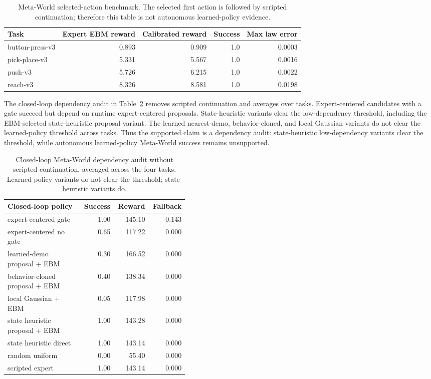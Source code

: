 \documentclass{article}
\begin{document}
\begin{table}[t]
\centering
\small
\setlength{\tabcolsep}{4pt}
\begin{tabular}{lrrrr}
\toprule
Task & Expert EBM reward & Calibrated reward & Success & Max law error \\
\midrule
button-press-v3 & 0.893 & 0.909 & 1.0 & 0.0003 \\
pick-place-v3 & 5.331 & 5.567 & 1.0 & 0.0016 \\
push-v3 & 5.726 & 6.215 & 1.0 & 0.0022 \\
reach-v3 & 8.326 & 8.581 & 1.0 & 0.0198 \\
\bottomrule
\end{tabular}
\caption{Meta-World selected-action benchmark. The selected first action is followed by scripted continuation; therefore this table is not autonomous learned-policy evidence.}
\label{tab:metaworld-selected}
\end{table}

The closed-loop dependency audit in Table~\ref{tab:closed-loop} removes scripted continuation and averages over tasks. Expert-centered candidates with a gate succeed but depend on runtime expert-centered proposals. State-heuristic variants clear the low-dependency threshold, including the EBM-selected state-heuristic proposal variant. The learned nearest-demo, behavior-cloned, and local Gaussian variants do not clear the learned-policy threshold across tasks. Thus the supported claim is a dependency audit: state-heuristic low-dependency variants clear the threshold, while autonomous learned-policy Meta-World success remains unsupported.

\begin{table}[t]
\centering
\small
\setlength{\tabcolsep}{3pt}
\begin{tabular}{p{0.42\linewidth}rrr}
\toprule
Closed-loop policy & Success & Reward & Fallback \\
\midrule
expert-centered gate & 1.00 & 145.10 & 0.143 \\
expert-centered no gate & 0.65 & 117.22 & 0.000 \\
learned-demo proposal + EBM & 0.30 & 166.52 & 0.000 \\
behavior-cloned proposal + EBM & 0.40 & 138.34 & 0.000 \\
local Gaussian + EBM & 0.05 & 117.98 & 0.000 \\
state heuristic proposal + EBM & 1.00 & 143.28 & 0.000 \\
state heuristic direct & 1.00 & 143.14 & 0.000 \\
random uniform & 0.00 & 55.40 & 0.000 \\
scripted expert & 1.00 & 143.14 & 0.000 \\
\bottomrule
\end{tabular}
\caption{Closed-loop Meta-World dependency audit without scripted continuation, averaged across the four tasks. Learned-policy variants do not clear the threshold; state-heuristic variants do.}
\label{tab:closed-loop}
\end{table}
\end{document}
